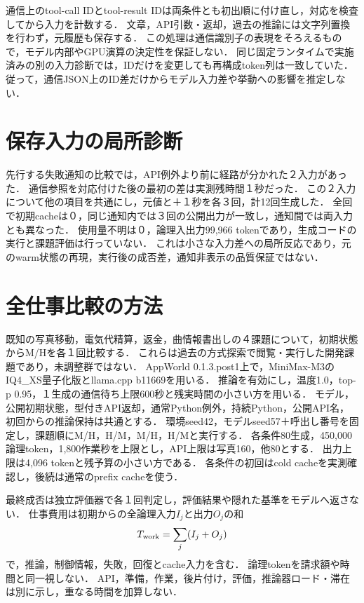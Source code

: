 \documentclass[uplatex,a4paper,twocolumn,10pt]{jsarticle}
\begin{document}
通信上のtool-call IDとtool-result IDは両条件とも初出順に付け直し，対応を検査してから入力を計数する．
文章，API引数・返却，過去の推論には文字列置換を行わず，元履歴も保存する．
この処理は通信識別子の表現をそろえるもので，モデル内部やGPU演算の決定性を保証しない．
同じ固定ランタイムで実施済みの別の入力診断では，IDだけを変更しても再構成token列は一致していた．
従って，通信JSON上のID差だけからモデル入力差や挙動への影響を推定しない．

\section{保存入力の局所診断}
先行する失敗通知の比較では，API例外より前に経路が分かれた２入力があった．
通信参照を対応付けた後の最初の差は実測残時間１秒だった．
この２入力について他の項目を共通にし，元値と＋１秒を各３回，計12回生成した．
全回で初期cacheは０，同じ通知内では３回の公開出力が一致し，通知間では両入力とも異なった．
使用量不明は０，論理入出力99,966 tokenであり，生成コードの実行と課題評価は行っていない．
これは小さな入力差への局所反応であり，元のwarm状態の再現，実行後の成否差，通知非表示の品質保証ではない．

\section{全仕事比較の方法}
既知の写真移動，電気代精算，返金，曲情報書出しの４課題について，初期状態からM/Hを各１回比較する．
これらは過去の方式探索で閲覧・実行した開発課題であり，未調整群ではない．
AppWorld 0.1.3.post1上で，MiniMax-M3のIQ4\_XS量子化版とllama.cpp b11669を用いる．
推論を有効にし，温度1.0，top-p 0.95，１生成の通信待ち上限600秒と残実時間の小さい方を用いる．
モデル，公開初期状態，型付きAPI返却，通常Python例外，持続Python，公開API名，初回からの推論保持は共通とする．
環境seed42，モデルseed57＋呼出し番号を固定し，課題順にM/H，H/M，M/H，H/Mと実行する．
各条件80生成，450,000論理token，1,800作業秒を上限とし，API上限は写真160，他80とする．
出力上限は4,096 tokenと残予算の小さい方である．
各条件の初回はcold cacheを実測確認し，後続は通常のprefix cacheを使う．

最終成否は独立評価器で各１回判定し，評価結果や隠れた基準をモデルへ返さない．
仕事費用は初期からの全論理入力$I_j$と出力$O_j$の和
\begin{equation}T_{\rm work}=\sum_j(I_j+O_j)\end{equation}
で，推論，制御情報，失敗，回復とcache入力を含む．
論理tokenを請求額や時間と同一視しない．
API，準備，作業，後片付け，評価，推論器ロード・滞在は別に示し，重なる時間を加算しない．
\end{document}
